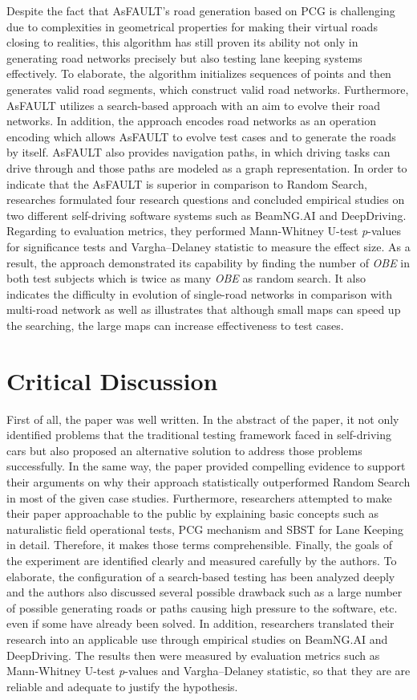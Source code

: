 \documentclass[10pt,a4paper]{report}
\begin{document}
Despite the fact that AsFAULT's road generation based on PCG is challenging due to complexities in geometrical properties for making their virtual roads closing to realities, 
this algorithm has still proven its ability not only in generating road networks precisely but also testing lane keeping systems effectively.
%
To elaborate, the algorithm initializes sequences of points and then generates valid road segments, which construct valid road networks.
%
Furthermore, AsFAULT utilizes a search-based approach with an aim to evolve their road networks.
%
In addition, the approach encodes road networks as an operation encoding which allows AsFAULT to evolve test cases and to generate the roads by itself. 
%
AsFAULT also provides navigation paths, in which driving tasks can drive through and those paths are modeled as a graph representation.
%
In order to indicate that the AsFAULT is superior in comparison to Random Search, researches formulated four research questions and concluded empirical studies on two different self-driving software systems such as BeamNG.AI and DeepDriving.
%
Regarding to evaluation metrics, they performed Mann-Whitney U-test \textit{p}-values for significance tests and Vargha–Delaney statistic to measure the effect size.
%
As a result, the approach demonstrated its capability by finding the number of \textit{OBE} in both test subjects which is twice as many \textit{OBE} as random search. It also indicates the difficulty in evolution of single-road networks in comparison with multi-road network as well as illustrates that although small maps can speed up the searching, the large maps can increase effectiveness to test cases.


\section{Critical Discussion}
First of all, the paper was well written. In the abstract of the paper, it not only identified problems that the traditional testing framework faced in self-driving cars but also proposed an alternative solution to address those problems successfully. In the same way, the paper provided compelling evidence to support their arguments on why their approach statistically outperformed Random Search in most of the given case studies. 
%
Furthermore, researchers attempted to make their paper approachable to the public by explaining basic concepts such as naturalistic field operational tests, PCG mechanism and SBST for Lane Keeping in detail. Therefore, it makes those terms comprehensible. 
%
Finally, the goals of the experiment are identified clearly and measured carefully by the authors. To elaborate, the configuration of a search-based testing has been analyzed deeply and the authors also discussed several possible drawback such as a large number of possible generating roads or paths causing high pressure to the software, etc. even if some have already been solved.
%
In addition, researchers translated their research into an applicable use through empirical studies on BeamNG.AI and DeepDriving. The results then were measured by evaluation metrics such as Mann-Whitney U-test \textit{p}-values and Vargha–Delaney statistic, so that they are are reliable and adequate to justify the hypothesis.
\end{document}
